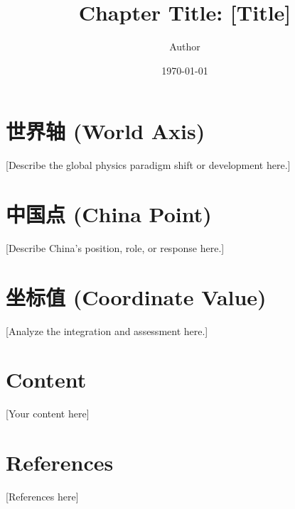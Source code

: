 \documentclass{article}
\title{Chapter Title: [Title]}
\author{Author}
\date{\today}
\begin{document}
\maketitle

\section{世界轴 (World Axis)}
[Describe the global physics paradigm shift or development here.]

\section{中国点 (China Point)}
[Describe China's position, role, or response here.]

\section{坐标值 (Coordinate Value)}
[Analyze the integration and assessment here.]

\section{Content}
[Your content here]

\section{References}
[References here]
\end{document}
